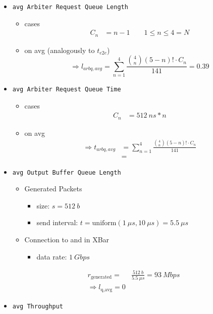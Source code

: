 \documentclass[]{scrartcl}
\begin{document}
\begin{itemize}
\begin{itemize}
            \end{itemize}
        \item \verb|avg Arbiter Request Queue Length|
            \begin{itemize}
                \item cases
                    \begin{align}
                        C_n &= n-1 \qquad 1\leq n\leq4=N
                    \end{align}
                \item on avg (analogously to $t_{e2e}$)
                    \begin{equation}
                        \Rightarrow l_{arbq,avg} = \sum_{n=1}^4 \frac{\binom{4}{n}\left( 5-n \right)! \cdot C_n }{141} = 0.39
                    \end{equation}
            \end{itemize}
        \item \verb|avg Arbiter Request Queue Time|
            \begin{itemize}
                \item cases
                    \begin{align}
                        C_n &= \SI{512}{ns} * n
                    \end{align}
                \item on avg
                    \begin{align}
                        \Rightarrow t_{arbq,avg} &= \sum_{n=1}^4 \frac{\binom{4}{n}\left( 5-n \right)! \cdot C_n }{141}\\
                                                 &= 
                    \end{align}
            \end{itemize}
        \item \verb|avg Output Buffer Queue Length|
            \begin{itemize}
                \item Generated Packets
                    \begin{itemize}
                        \item size: $ s = \SI{512}{b}$
                        \item send interval: $ t = \text{uniform}(\SI{1}{\mu s}, \SI{10}{\mu s}) = \SI{5.5}{\mu s}$
                    \end{itemize}
                \item Connection to and in XBar
                    \begin{itemize}
                        \item data rate: $\SI{1}{Gbps}$
                    \end{itemize}
            \end{itemize}
            \begin{align}
                r_\text{generated} =& \frac{\SI{512}{b}}{\SI{5.5}{\mu s}} = \SI{93}{Mbps}\\
                \Rightarrow l_\text{q,avg} = 0
            \end{align}
        \item \verb|avg Throughput|


\end{itemize}
\end{document}
